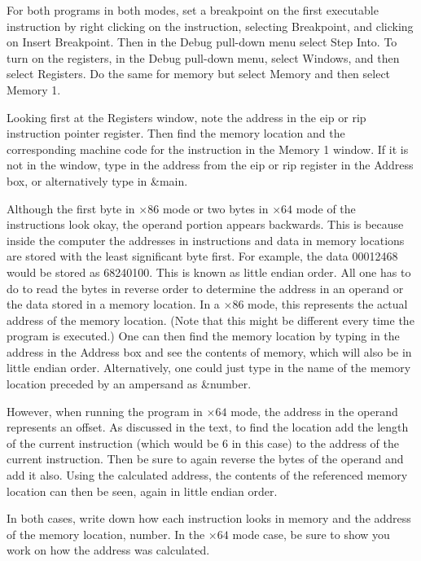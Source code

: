 \documentclass[10pt]{book}
\begin{document}
For both programs in both modes, set a breakpoint on the first executable instruction by right clicking on the instruction, selecting Breakpoint, and clicking on Insert Breakpoint. Then in the Debug pull-down menu select Step Into. To turn on the registers, in the Debug pull-down menu, select Windows, and then select Registers. Do the same for memory but select Memory and then select Memory 1.

Looking first at the Registers window, note the address in the eip or rip instruction pointer register. Then find the memory location and the corresponding machine code for the instruction in the Memory 1 window. If it is not in the window, type in the address from the eip or rip register in the Address box, or alternatively type in \&main.

Although the first byte in $\times 86$ mode or two bytes in $\times 64$ mode of the instructions look okay, the operand portion appears backwards. This is because inside the computer the addresses in instructions and data in memory locations are stored with the least significant byte first. For example, the data 00012468 would be stored as 68240100. This is known as little endian order. All one has to do to read the bytes in reverse order to determine the address in an operand or the data stored in a memory location.
In a $\times 86$ mode, this represents the actual address of the memory location. (Note that this might be different every time the program is executed.) One can then find the memory location by typing in the address in the Address box and see the contents of memory, which will also be in little endian order. Alternatively, one could just type in the name of the memory location preceded by an ampersand as \&number.

However, when running the program in $\times 64$ mode, the address in the operand represents an offset. As discussed in the text, to find the location add the length of the current instruction (which would be 6 in this case) to the address of the current instruction. Then be sure to again reverse the bytes of the operand and add it also. Using the calculated address, the contents of the referenced memory location can then be seen, again in little endian order.

In both cases, write down how each instruction looks in memory and the address of the memory location, number. In the $\times 64$ mode case, be sure to show you work on how the address was calculated.
\end{document}
